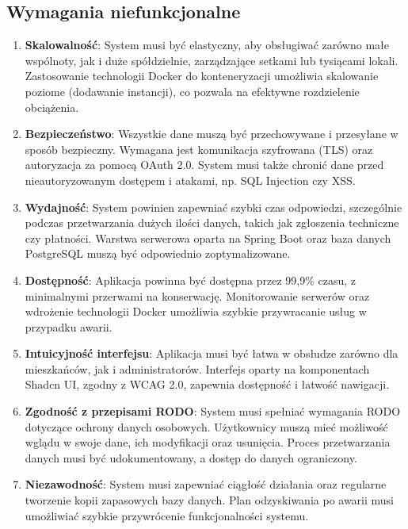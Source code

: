 \subsection{Wymagania niefunkcjonalne}

\begin{enumerate}[label=\arabic*.]

   \item \textbf{Skalowalność}: System musi być elastyczny, aby obsługiwać zarówno małe wspólnoty, jak i duże spółdzielnie, zarządzające setkami lub tysiącami lokali. Zastosowanie technologii Docker do konteneryzacji umożliwia skalowanie poziome (dodawanie instancji), co pozwala na efektywne rozdzielenie obciążenia.

	\item \textbf{Bezpieczeństwo}: Wszystkie dane muszą być przechowywane i przesyłane w sposób bezpieczny. Wymagana jest komunikacja szyfrowana (TLS) oraz autoryzacja za pomocą OAuth 2.0. System musi także chronić dane przed nieautoryzowanym dostępem i atakami, np. SQL Injection czy XSS.

	\item \textbf{Wydajność}: System powinien zapewniać szybki czas odpowiedzi, szczególnie podczas przetwarzania dużych ilości danych, takich jak zgłoszenia techniczne czy płatności. Warstwa serwerowa oparta na Spring Boot oraz baza danych PostgreSQL muszą być odpowiednio zoptymalizowane.

	\item \textbf{Dostępność}: Aplikacja powinna być dostępna przez 99,9\% czasu, z minimalnymi przerwami na konserwację. Monitorowanie serwerów oraz wdrożenie technologii Docker umożliwia szybkie przywracanie usług w przypadku awarii.

	\item \textbf{Intuicyjność interfejsu}: Aplikacja musi być łatwa w obsłudze zarówno dla mieszkańców, jak i administratorów. Interfejs oparty na komponentach Shadcn UI, zgodny z WCAG 2.0, zapewnia dostępność i łatwość nawigacji.

	\item \textbf{Zgodność z przepisami RODO}: System musi spełniać wymagania RODO dotyczące ochrony danych osobowych. Użytkownicy muszą mieć możliwość wglądu w swoje dane, ich modyfikacji oraz usunięcia. Proces przetwarzania danych musi być udokumentowany, a dostęp do danych ograniczony.

	\item \textbf{Niezawodność}: System musi zapewniać ciągłość działania oraz regularne tworzenie kopii zapasowych bazy danych. Plan odzyskiwania po awarii musi umożliwiać szybkie przywrócenie funkcjonalności systemu.


\end{enumerate}
